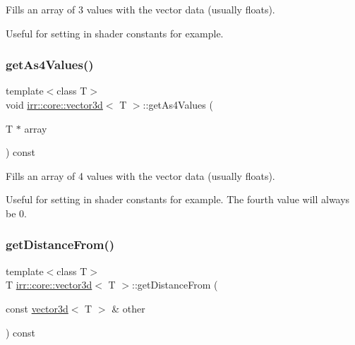 Fills an array of 3 values with the vector data (usually floats). 

Useful for setting in shader constants for example. \mbox{\label{classirr_1_1core_1_1vector3d_aa661941fdf725c83dc560b15232fdf6e}} 
\subsubsection{\texorpdfstring{get\+As4\+Values()}{getAs4Values()}}
{\footnotesize\ttfamily template$<$class T$>$ \\
void \hyperlink{classirr_1_1core_1_1vector3d}{irr\+::core\+::vector3d}$<$ T $>$\+::get\+As4\+Values (\begin{DoxyParamCaption}\item[{T $\ast$}]{array }\end{DoxyParamCaption}) const\hspace{0.3cm}{\ttfamily [inline]}}



Fills an array of 4 values with the vector data (usually floats). 

Useful for setting in shader constants for example. The fourth value will always be 0. \mbox{\label{classirr_1_1core_1_1vector3d_ab838ab8784f4e53453eb45223f624760}} 
\subsubsection{\texorpdfstring{get\+Distance\+From()}{getDistanceFrom()}}
{\footnotesize\ttfamily template$<$class T$>$ \\
T \hyperlink{classirr_1_1core_1_1vector3d}{irr\+::core\+::vector3d}$<$ T $>$\+::get\+Distance\+From (\begin{DoxyParamCaption}\item[{const \hyperlink{classirr_1_1core_1_1vector3d}{vector3d}$<$ T $>$ \&}]{other }\end{DoxyParamCaption}) const\hspace{0.3cm}{\ttfamily [inline]}}



